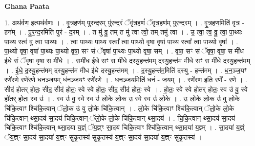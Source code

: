 \documentclass[17pt]{extarticle}
\begin{document}
\textbf{Ghana Paata } \newline

1. अथ॑र्वण॒ इत्यथ॑र्वणः । . वृ॒त्र॒हण॑म् पुरन्द॒रम् पु॑रन्द॒रं ॅवृ॑त्र॒हणं॑ ॅवृत्र॒हण॑म् पुरन्द॒रम् । . वृ॒त्र॒हण॒मिति॑ वृत्र - हन᳚म् । . पु॒र॒न्द॒रमिति॑ पुरं - द॒रम् । . त मु॑ वु॒ तम् त मु॑ त्वा त्वो॒ तम् तमु॑ त्वा । . उ॒ त्वा॒ त्व॒ वु॒ त्वा॒ पा॒थ्यः पा॒थ्य स्त्व॑ वु त्वा पा॒थ्यः । . त्वा॒ पा॒थ्यः पा॒थ्य स्त्वा᳚ त्वा पा॒थ्यो वृषा॒ वृषा॑ पा॒थ्य स्त्वा᳚ त्वा पा॒थ्यो वृषा᳚ । . पा॒थ्यो वृषा॒ वृषा॑ पा॒थ्यः पा॒थ्यो वृषा॒ सꣳ सं ॅवृषा॑ पा॒थ्यः पा॒थ्यो वृषा॒ सम् । . वृषा॒ सꣳ सं ॅवृषा॒ वृषा॒ स मी॑ध ईधे॒ सं ॅवृषा॒ वृषा॒ स मी॑धे । . समी॑ध ईधे॒ सꣳ स मी॑धे दस्यु॒हन्त॑मम् दस्यु॒हन्त॑म मीधे॒ सꣳ स मी॑धे दस्यु॒हन्त॑मम् । . ई॒धे॒ द॒स्यु॒हन्त॑मम् दस्यु॒हन्त॑म मीध ईधे दस्यु॒हन्त॑मम् । . द॒स्यु॒हन्त॑म॒मिति॑ दस्यु - हन्त॑मम् । . ध॒न॒ञ्ज॒यꣳ रणे॑रणे॒ रणे॑रणे धनञ्ज॒यम् ध॑नञ्ज॒यꣳ रणे॑रणे । . ध॒न॒ञ्ज॒यमिति॑ धनं - ज॒यम् । . रणे॑रण॒ इति॒ रणे᳚ - र॒णे॒ । . सीद॑ होतर् होतः॒ सीद॒ सीद॑ होतः॒ स्वे स्वे हो॑तः॒ सीद॒ सीद॑ होतः॒ स्वे । . हो॒तः॒ स्वे स्वे हो॑तर् होतः॒ स्व उ॑ वु॒ स्वे हो॑तर् होतः॒ स्व उ॑ । . स्व उ॑ वु॒ स्वे स्व उ॑ लो॒के लो॒क उ॒ स्वे स्व उ॑ लो॒के । . उ॒ लो॒के लो॒क उ॑ वु लो॒के चि॑कि॒त्वाꣳ श्चि॑कि॒त्वान् ॅलो॒क उ॑ वु लो॒के चि॑कि॒त्वान् । . लो॒के चि॑कि॒त्वाꣳ श्चि॑कि॒त्वान् ॅलो॒के लो॒के चि॑कि॒त्वान् थ्सा॒दय॑ सा॒दय॑ चिकि॒त्वान् ॅलो॒के लो॒के चि॑कि॒त्वान् थ्सा॒दय॑ । . चि॒कि॒त्वान् थ्सा॒दय॑ सा॒दय॑ चिकि॒त्वाꣳ श्चि॑कि॒त्वान् थ्सा॒दया॑ य॒ज्ञ्ं ॅय॒ज्ञ्ꣳ सा॒दय॑ चिकि॒त्वाꣳ श्चि॑कि॒त्वान् थ्सा॒दया॑ य॒ज्ञ्म् । . सा॒दया॑ य॒ज्ञ्ं ॅय॒ज्ञ्ꣳ सा॒दय॑ सा॒दया॑ य॒ज्ञ्ꣳ सु॑कृ॒तस्य॑ सुकृ॒तस्य॑ य॒ज्ञ्ꣳ सा॒दय॑ सा॒दया॑ य॒ज्ञ्ꣳ सु॑कृ॒तस्य॑ । \newline
\end{document}
